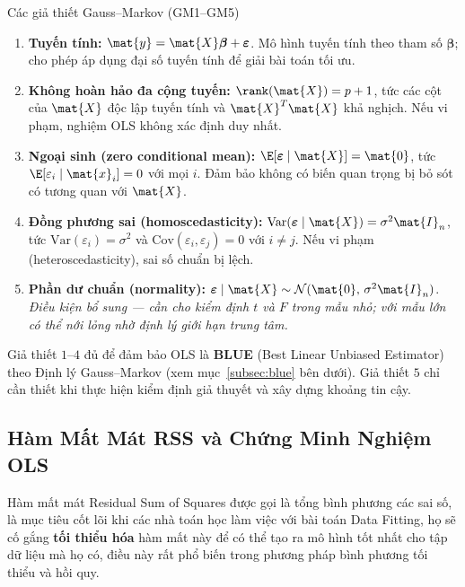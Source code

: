 \begin{mydef}{Các giả thiết Gauss--Markov (GM1–GM5)}{}
\begin{enumerate}[label=\textbf{\arabic*.}, leftmargin=2.5cm, noitemsep]
    \item \textbf{Tuyến tính:} $\mat{y} = \mat{X}\boldsymbol{\beta} + \boldsymbol{\varepsilon}$.
          Mô hình tuyến tính theo tham số $\boldsymbol{\beta}$; cho phép áp dụng
          đại số tuyến tính để giải bài toán tối ưu.

    \item \textbf{Không hoàn hảo đa cộng tuyến:} $\rank(\mat{X}) = p + 1$,
          tức các cột của $\mat{X}$ độc lập tuyến tính và $\mat{X}^T\mat{X}$ khả nghịch.
          Nếu vi phạm, nghiệm OLS không xác định duy nhất.

    \item \textbf{Ngoại sinh (zero conditional mean):}
          $\E[\boldsymbol{\varepsilon} \mid \mat{X}] = \mat{0}$,
          tức $\E[\varepsilon_i \mid \mat{x}_i] = 0$ với mọi $i$.
          Đảm bảo không có biến quan trọng bị bỏ sót có tương quan với $\mat{X}$.

    \item \textbf{Đồng phương sai (homoscedasticity):}
          $\mathrm{Var}(\boldsymbol{\varepsilon} \mid \mat{X}) = \sigma^2\mat{I}_n$,
          tức $\mathrm{Var}(\varepsilon_i) = \sigma^2$ và
          $\mathrm{Cov}(\varepsilon_i, \varepsilon_j) = 0$ với $i \neq j$.
          Nếu vi phạm (heteroscedasticity), sai số chuẩn bị lệch.

    \item \textbf{Phần dư chuẩn (normality):}
          $\boldsymbol{\varepsilon} \mid \mat{X} \sim \mathcal{N}(\mat{0},\, \sigma^2\mat{I}_n)$.
          \emph{Điều kiện bổ sung — cần cho kiểm định $t$ và $F$ trong mẫu nhỏ;
          với mẫu lớn có thể nới lỏng nhờ định lý giới hạn trung tâm.}
\end{enumerate}
\end{mydef}

\begin{note}
Giả thiết $1–4$ đủ để đảm bảo OLS là \textbf{BLUE} (Best Linear Unbiased Estimator)
theo Định lý Gauss--Markov (xem mục~\ref{subsec:blue} bên dưới).
Giả thiết $5$ chỉ cần thiết khi thực hiện kiểm định giả thuyết và xây dựng khoảng tin cậy.
\end{note}

\subsection{Hàm Mất Mát RSS và Chứng Minh Nghiệm OLS}
Hàm mất mát Residual Sum of Squares được gọi là tổng bình phương các sai số, là mục tiêu cốt lõi khi các nhà toán học làm việc với bài toán Data Fitting, họ sẽ cố gắng \textbf{tối thiểu hóa} hàm mất này để có thể tạo ra mô hình tốt nhất cho tập dữ liệu mà họ có, điều này rất phổ biến trong phương pháp bình phương tối thiểu và hồi quy.

